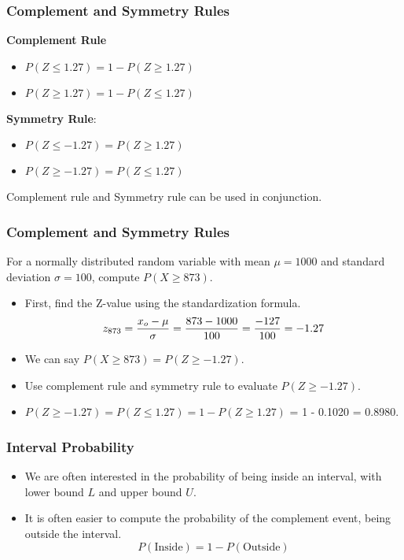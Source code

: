 \begin{itemize}
\begin{frame}
	\frametitle{Complement and Symmetry Rules}
	\textbf{Complement Rule}
	
	\begin{itemize}
		\item $P(Z \leq 1.27) = 1-P(Z \geq 1.27) $
		\item $ P(Z \geq 1.27) = 1-P(Z \leq 1.27) $
	\end{itemize}
	
	\bigskip
	\textbf{Symmetry Rule}:
	\begin{itemize}
		\item $ P(Z \leq -1.27) = P(Z \geq 1.27) $
		\item $ P(Z \geq -1.27) = P(Z \leq 1.27) $
	\end{itemize}
	
	Complement rule and Symmetry rule can be used in conjunction.
\end{frame}




\begin{frame}
	\frametitle{Complement and Symmetry Rules}
	
	For a normally distributed random variable with mean $\mu = 1000$ and standard deviation $\sigma = 100$, compute $P(X \geq 873)$.
	
	\begin{itemize} \item First, find the Z-value using the standardization formula.
		\[
		z_{873} = {x_o - \mu \over \sigma} = {873 - 1000 \over 100} = {-127 \over 100} = -1.27
		\]
		\item We can say $P(X \geq 873) = P(Z \geq -1.27)$.
		\item Use complement rule and symmetry rule to evaluate  $P(Z \geq -1.27)$.
		\item $ P(Z \geq -1.27) = P(Z \leq 1.27) = 1 - P(Z \geq 1.27) $  = 1 - 0.1020 = \alert{0.8980}.
	\end{itemize}
\end{frame}


\begin{frame}
	\frametitle{Interval Probability}
	\begin{itemize}
		\item We are often interested in the probability of being inside an interval, with lower bound $L$ and upper bound $U$.
		\item It is often easier to compute the probability of the complement event, being outside the interval.
		\[ P( \mbox{Inside} ) = 1 - P( \mbox{Outside} )  \]
		

\end{itemize}
\end{frame}
\end{itemize}
